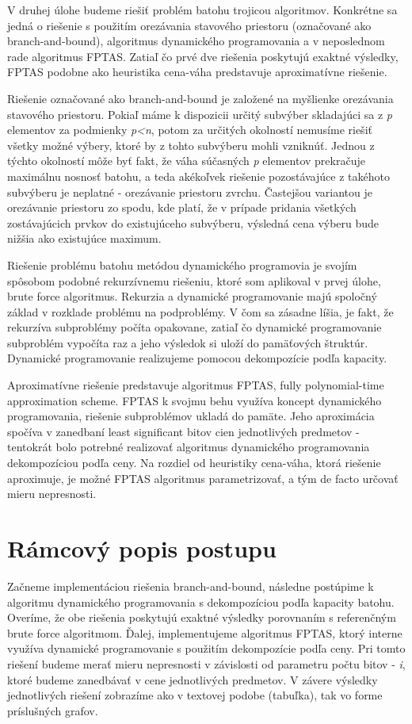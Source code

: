 \documentclass[slovak]{article}
\begin{document}
V druhej úlohe budeme riešiť problém batohu trojicou algoritmov. Konkrétne sa jedná o riešenie s použitím orezávania stavového priestoru (označované ako branch-and-bound), algoritmus dynamického programovania a v neposlednom rade algoritmus FPTAS. Zatiaľ čo prvé dve riešenia poskytujú exaktné výsledky, FPTAS podobne ako heuristika cena-váha predstavuje aproximatívne riešenie.

Riešenie označované ako branch-and-bound je založené na myšlienke orezávania stavového priestoru. Pokiaľ máme k dispozicii určitý subvýber skladajúci sa z \emph{p} elementov za podmienky \emph{p<n}, potom za určitých okolností nemusíme riešiť všetky možné výbery, ktoré by z tohto subvýberu mohli vzniknúť. Jednou z týchto okolností môže byť fakt, že váha súčasných \emph{p} elementov prekračuje maximálnu nosnosť batohu, a teda akékoľvek riešenie pozostávajúce z takéhoto subvýberu je neplatné - orezávanie priestoru zvrchu. Častejšou variantou je orezávanie priestoru zo spodu, kde platí, že v prípade pridania všetkých zostávajúcich prvkov do existujúceho subvýberu, výsledná cena výberu bude nižšia ako existujúce maximum.

Riešenie problému batohu metódou dynamického programovia je svojím spôsobom podobné rekurzívnemu riešeniu, ktoré som aplikoval v prvej úlohe, brute force algoritmus. Rekurzia a dynamické programovanie majú spoločný základ v rozklade problému na podproblémy. V čom sa zásadne líšia, je fakt, že rekurzíva subproblémy počíta opakovane, zatiaľ čo dynamické programovanie subproblém vypočíta raz a jeho výsledok si uloží do pamäťových štruktúr. Dynamické programovanie realizujeme pomocou dekompozície podľa kapacity.

Aproximatívne riešenie predstavuje algoritmus FPTAS, fully polynomial-time approximation scheme. FPTAS k svojmu behu využíva koncept dynamického programovania, riešenie subproblémov ukladá do pamäte. Jeho aproximácia spočíva v zanedbaní least significant bitov cien jednotlivých predmetov - tentokrát bolo potrebné realizovať algoritmus dynamického programovania dekompozíciou podľa ceny. Na rozdiel od heuristiky cena-váha, ktorá riešenie aproximuje, je možné FPTAS algoritmus parametrizovať, a tým de facto určovať mieru nepresnosti.

\section{Rámcový popis postupu}

Začneme implementáciou riešenia branch-and-bound, následne postúpime k algoritmu dynamického programovania s dekompozíciou podľa kapacity batohu. Overíme, že obe riešenia poskytujú exaktné výsledky porovnaním s referenčným brute force algoritmom. Ďalej, implementujeme algoritmus FPTAS, ktorý interne využíva dynamické programovanie s použitím dekompozície podľa ceny. Pri tomto riešení budeme merať mieru nepresnosti v závislosti od parametru počtu bitov - \emph{i}, ktoré budeme zanedbávať v cene jednotlivých predmetov. V závere výsledky jednotlivých riešení zobrazíme ako v textovej podobe (tabuľka), tak vo forme príslušných grafov.
\end{document}
